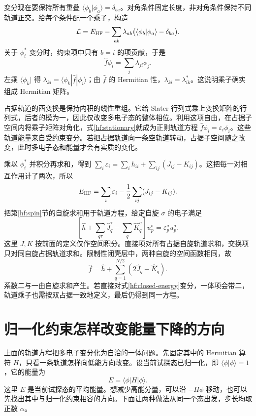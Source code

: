 变分现在要保持所有重叠 $\langle\phi_b|\phi_a\rangle=\delta_{ba}$。对角条件固定长度，非对角条件保持不同轨道正交。给每个条件配一个乘子，构造
\begin{equation}
\mathcal L=E_{\rm HF}-\sum_{ab}\lambda_{ab}
\bigl(\langle\phi_b|\phi_a\rangle-\delta_{ba}\bigr).
\end{equation}
关于 $\phi_i^*$ 变分时，约束项中只有 $b=i$ 的项贡献，于是
\begin{equation}\label{hf:stationary}
\hat f\phi_i=\sum_j\lambda_{ji}\phi_j.
\end{equation}
左乘 $\langle\phi_k|$ 得 $\lambda_{ki}=\langle\phi_k|\hat f|\phi_i\rangle$；由 $\hat f$ 的 Hermitian 性，$\lambda_{ki}=\lambda_{ik}^*$。这说明乘子确实组成 Hermitian 矩阵。

占据轨道的酉变换是保持内积的线性重组。它给 Slater 行列式乘上变换矩阵的行列式，后者的模为一，因此仅改变多电子态的整体相位。利用这项自由，在占据子空间内将乘子矩阵对角化，式\eqref{hf:stationary}就成为正则轨道方程 $\hat f\phi_i=\varepsilon_i\phi_i$。这些轨道能量来自受约束变分。若把占据轨道向一条空轨道转动，占据子空间随之改变，此时多电子态和能量才会有实质的变化。

乘以 $\phi_i^*$ 并积分再求和，得到 $\sum_i\varepsilon_i=\sum_i h_{ii}+\sum_{ij}(J_{ij}-K_{ij})$。这把每一对相互作用计了两次，所以
\begin{equation}
E_{\rm HF}=\sum_i\varepsilon_i-\frac12\sum_{ij}(J_{ij}-K_{ij}).
\end{equation}
把第\ref{hf:spin}节的自旋求和用于轨道方程，给定自旋 $\sigma$ 的电子满足
\begin{equation}
\left[\hat h+\sum_{q\tau}\hat J_q^\tau-\sum_q\hat K_q^\sigma\right]u_p^\sigma
=\varepsilon_p^\sigma u_p^\sigma.
\end{equation}
这里 $J,K$ 按前面的定义仅作空间积分。直接项对所有占据自旋轨道求和，交换项只对同自旋占据轨道求和。限制性闭壳层中，两种自旋的空间函数相同，故
\begin{equation}\label{hf:closed-fock}
\hat f=\hat h+\sum_{q=1}^{N/2}(2\hat J_q-\hat K_q).
\end{equation}
系数二与一由自旋求和产生。若直接对式\eqref{hf:closed-energy}变分，一体项会带二，轨道乘子也需按双占据一致地定义，最后仍得到同一方程。

\section{归一化约束怎样改变能量下降的方向}\label{hf:constrained-descent}
上面的轨道方程把多电子变分化为自洽的一体问题。先固定其中的 Hermitian 算符 $H$，只看一条轨道怎样向低能方向改变。设当前试探态已归一化，即 $\langle\phi|\phi\rangle=1$，它的能量为
\begin{equation}
E=\langle\phi|H|\phi\rangle.
\end{equation}
这里 $E$ 是当前试探态的平均能量。想减少高能分量，可以沿 $-H\phi$ 移动，也可以先找出其中与归一化约束相容的方向。下面让两种做法从同一个态出发，步长均取正数 $\alpha$。

